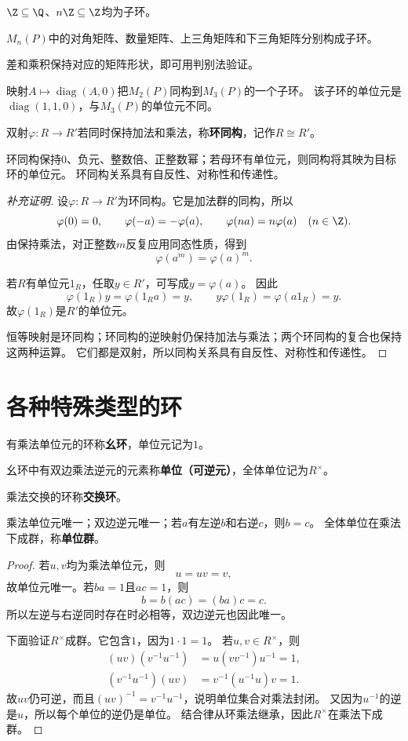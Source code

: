 \begin{example}
$\Z\subseteq\Q$、$n\Z\subseteq\Z$均为子环。

$M_n(P)$中的对角矩阵、数量矩阵、上三角矩阵和下三角矩阵分别构成子环。

差和乘积保持对应的矩阵形状，即可用判别法验证。

映射$A\mapsto\operatorname{diag}(A,0)$把$M_2(P)$同构到$M_3(P)$的一个子环。
该子环的单位元是$\operatorname{diag}(1,1,0)$，与$M_3(P)$的单位元不同。
\end{example}

\begin{definition}
双射$\varphi:R\to R'$若同时保持加法和乘法，称\textbf{环同构}，记作$R\cong R'$。
\end{definition}
\begin{proposition}
环同构保持$0$、负元、整数倍、正整数幂；若母环有单位元，则同构将其映为目标环的单位元。
环同构关系具有自反性、对称性和传递性。
\end{proposition}
\begin{proof}[补充证明]
设$\varphi:R\to R'$为环同构。它是加法群的同构，所以
\[
\varphi(0)=0,
\qquad \varphi(-a)=-\varphi(a),
\qquad \varphi(na)=n\varphi(a)\quad(n\in\Z).
\]
由保持乘法，对正整数$m$反复应用同态性质，得到
\[
\varphi(a^m)=\varphi(a)^m.
\]

若$R$有单位元$1_R$，任取$y\in R'$，可写成$y=\varphi(a)$。
因此
\[
\varphi(1_R)y=\varphi(1_Ra)=y,
\qquad y\varphi(1_R)=\varphi(a1_R)=y.
\]
故$\varphi(1_R)$是$R'$的单位元。

恒等映射是环同构；环同构的逆映射仍保持加法与乘法；两个环同构的复合也保持这两种运算。
它们都是双射，所以同构关系具有自反性、对称性和传递性。
\end{proof}
\section{各种特殊类型的环}
\begin{definition}
有乘法单位元的环称\textbf{幺环}，单位元记为$1$。

幺环中有双边乘法逆元的元素称\textbf{单位（可逆元）}，全体单位记为$R^\times$。

乘法交换的环称\textbf{交换环}。
\end{definition}

\begin{proposition}
乘法单位元唯一；双边逆元唯一；若$a$有左逆$b$和右逆$c$，则$b=c$。
全体单位在乘法下成群，称\textbf{单位群}。
\end{proposition}
\begin{proof}
若$u,v$均为乘法单位元，则
\[
u=uv=v,
\]
故单位元唯一。若$ba=1$且$ac=1$，则
\[b=b(ac)=(ba)c=c.\]
所以左逆与右逆同时存在时必相等，双边逆元也因此唯一。

下面验证$R^\times$成群。它包含$1$，因为$1\cdot1=1$。
若$u,v\in R^\times$，则
\[
\begin{aligned}
(uv)(v^{-1}u^{-1})&=u(vv^{-1})u^{-1}=1,\\
(v^{-1}u^{-1})(uv)&=v^{-1}(u^{-1}u)v=1.
\end{aligned}
\]
故$uv$仍可逆，而且$(uv)^{-1}=v^{-1}u^{-1}$，说明单位集合对乘法封闭。
又因为$u^{-1}$的逆是$u$，所以每个单位的逆仍是单位。
结合律从环乘法继承，因此$R^\times$在乘法下成群。
\end{proof}

